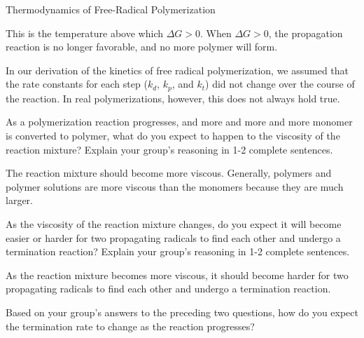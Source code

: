 \begin{activity}{Thermodynamics of Free-Radical Polymerization}
\begin{ctqs}
\begin{enumerate}
				\begin{solution}[1.5in]{}
					This is the temperature above which $\Delta G > 0$.  When $\Delta G > 0$, the propagation reaction is no longer favorable, and no more polymer will form.
				\end{solution}
				
		\end{enumerate}

\end{ctqs}



\begin{model}
\label{\labelbase:mdl:rxnrates}

	In our derivation of the kinetics of free radical polymerization, we assumed that the rate constants for each step ($k_d$, $k_p$, and $k_t$) did not change over the course of the reaction.  In real polymerizations, however, this does not always hold true.

\end{model}

\begin{ctqs}

	\question As a polymerization reaction progresses, and more and more and more monomer is converted to polymer, what do you expect to happen to the viscosity of the reaction mixture?  Explain your group's reasoning in 1-2 complete sentences.
	
		\begin{solution}[1.5in]{}
			The reaction mixture should become more viscous.  Generally, polymers and polymer solutions are more viscous than the monomers because they are much larger.		
		\end{solution}
		
	\question As the viscosity of the reaction mixture changes, do you expect it will become easier or harder for two propagating radicals to find each other and undergo a termination reaction?  Explain your group's reasoning in 1-2 complete sentences.
	
		\begin{solution}[1.5in]{}
			As the reaction mixture becomes more viscous, it should become harder for two propagating radicals to find each other and undergo a termination reaction.
		\end{solution}
	
	\question Based on your group's answers to the preceding two questions, how do you expect the termination rate to change as the reaction progresses?
	

\end{ctqs}
\end{activity}
